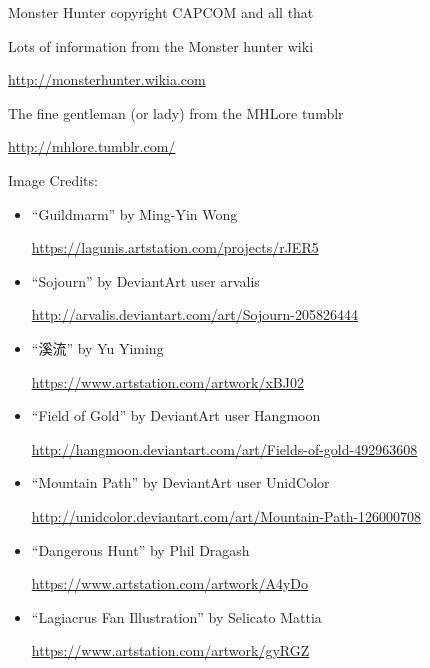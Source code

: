 \item Monster Hunter copyright CAPCOM and all that
\item Lots of information from the Monster hunter wiki

\url{http://monsterhunter.wikia.com}

\item The fine gentleman (or lady) from the MHLore tumblr

\url{http://mhlore.tumblr.com/}

\item Image Credits: \begin{itemize}

\item ``Guildmarm'' by Ming-Yin Wong

\url{https://lagunis.artstation.com/projects/rJER5}
\item ``Sojourn'' by DeviantArt user arvalis

\url{http://arvalis.deviantart.com/art/Sojourn-205826444}

\item ``溪流'' by Yu Yiming

\url{https://www.artstation.com/artwork/xBJ02}

\item ``Field of Gold'' by DeviantArt user Hangmoon

\url{http://hangmoon.deviantart.com/art/Fields-of-gold-492963608}

\item ``Mountain Path'' by DeviantArt user UnidColor

\url{http://unidcolor.deviantart.com/art/Mountain-Path-126000708}

\item ``Dangerous Hunt'' by Phil Dragash

\url{https://www.artstation.com/artwork/A4yDo}

\item ``Lagiacrus Fan Illustration'' by Selicato Mattia

\url{https://www.artstation.com/artwork/gyRGZ}
\end{itemize}
